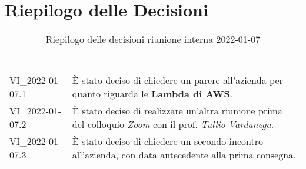 \section{Riepilogo delle Decisioni}


\begin{table}[!htbp]
\renewcommand{\arraystretch}{1.5}
\begin{tabular}{m{}<{\centering}  m{}<{\centering}}
\rowcolor{darkblue} \textcolor{white}{\textbf{Codice}} & \textcolor{white}{\textbf{Decisione}} \\
\hline
VI\_2022-01-07.1 & È stato deciso di chiedere un parere all'azienda per quanto riguarda le \textbf{Lambda di AWS}.\\
\rowcolor{gray!10} VI\_2022-01-07.2 &  È stato deciso di realizzare un'altra riunione prima del colloquio \textit{Zoom} con il prof. \textit{Tullio Vardanega}.\\
VI\_2022-01-07.3 & È stato deciso di chiedere un secondo incontro all'azienda, con data antecedente alla prima consegna.\\
\end{tabular}
\caption{Riepilogo delle decisioni riunione interna 2022-01-07}
\end{table}